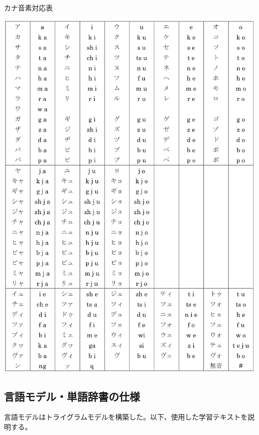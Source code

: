 \begin{table}[H]
  \begin{center}
    \caption{カナ音素対応表 \label{fig:kana_onso}}
    \includegraphics[scale=0.7]{./figure/kana_onso.eps}
  \end{center}
  
\end{table}

\subsection{言語モデル・単語辞書の仕様}
\label{section:experiment_language_model}
言語モデルはトライグラムモデルを構築した。以下、使用した学習テキストを説明する。

